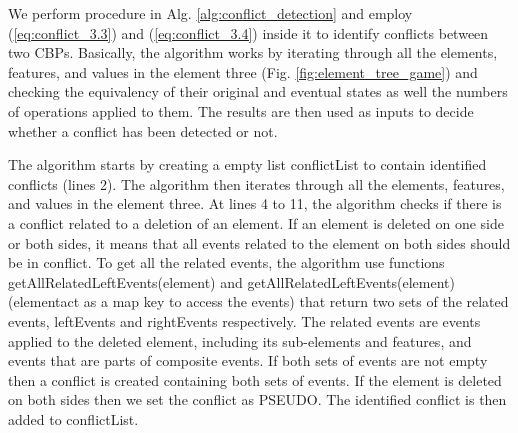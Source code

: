 We perform procedure in Alg. \ref{alg:conflict_detection} and employ (\ref{eq:conflict_3.3}) and (\ref{eq:conflict_3.4}) inside it to identify conflicts between two CBPs. Basically, the algorithm works by iterating through all the elements, features, and values in the element three (Fig. \ref{fig:element_tree_game}) and checking the equivalency of their original and eventual states as well the numbers of operations applied to them. The results are then used as inputs to decide whether a conflict has been detected or not.

The algorithm starts by creating a empty list \textsf{conflictList} to contain identified conflicts (lines 2). The algorithm then iterates through all the elements, features, and values in the element three. At lines 4 to 11, the algorithm checks if there is a conflict related to a deletion of an element. If an element is deleted on one side or both sides, it means that all events related to the element on both sides should be in conflict. To get all the related events, the algorithm use functions \textsf{getAllRelatedLeftEvents(element)} and \textsf{getAllRelatedLeftEvents(element)} (elementact as a map key to access the events) that return two sets of the related events, \textsf{leftEvents} and \textsf{rightEvents} respectively. The related events are events applied to the deleted element, including its sub-elements and features, and events that are parts of composite events. If both sets of events are not empty then a conflict is created containing both sets of events. If the element is deleted on both sides then we set the conflict as \textsf{PSEUDO}. The identified conflict is then added to \textsf{conflictList}.

